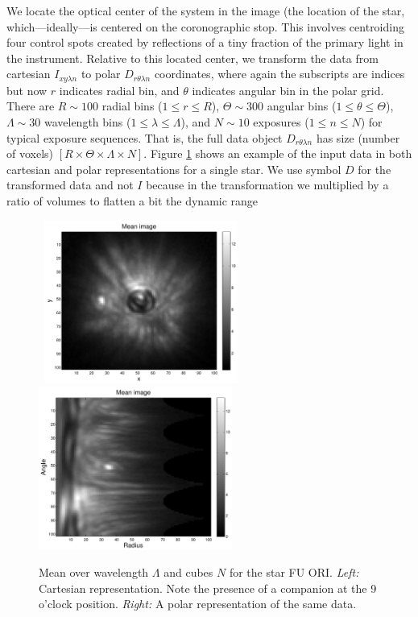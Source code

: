 \documentclass[12pt,pdftex,preprint]{aastex}
\begin{document}
We locate the optical center of the system in the image (the location
of the star, which---ideally---is centered on the coronographic stop.
This involves centroiding four control spots created by reflections of
a tiny fraction of the primary light in the instrument.  Relative to
this located center, we transform the data from cartesian $I_{x y
 \lambda n}$ to polar $D_{r \theta \lambda n}$ coordinates, where
again the subscripts are indices but now $r$ indicates radial bin, and
$\theta$ indicates angular bin in the polar grid.  There are $R\sim
100$ radial bins ($1\leq r\leq R$), $\Theta\sim 300$ angular bins
($1\leq\theta\leq\Theta$), $\Lambda\sim 30$ wavelength bins
($1\leq\lambda\leq\Lambda$), and $N\sim 10$ exposures ($1\leq
n\leq N$) for typical exposure sequences.  That is, the full data
object $D_{r \theta \lambda n}$ has size (number of voxels)
$[R\times\Theta\times\Lambda\times N]$.  Figure \ref{fig:mean} shows
an example of the input data in both cartesian and polar
representations for a single star. We use symbol $D$ for the
transformed data and not $I$ because in the transformation we
multiplied by a ratio of volumes to flatten a bit the dynamic range

\begin{figure}[h!]
\begin{center}
\mbox{
\includegraphics[width=2.5in]{figs/mean_xy.pdf}
\includegraphics[width=2.5in]{figs/mean_rt.pdf}
}
\end{center}
\vspace{-7mm}
\caption{Mean over wavelength $\Lambda$ and cubes $N$ for the star
 FU ORI. {\em Left:} Cartesian representation. Note the presence of a
 companion at the 9 o'clock position. {\em Right:} A polar representation
 of the same data.}
\label{fig:mean}
\end{figure}
\end{document}
